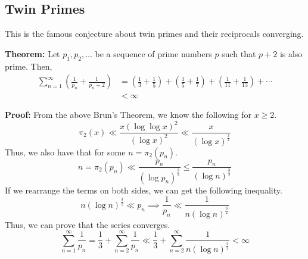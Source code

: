 \documentclass[8pt]{extarticle}
\begin{document}
\subsection{Twin Primes}
This is the famous conjecture about twin primes and their reciprocals converging.
\begin{boxedsection}
    \textbf{Theorem:} Let $p_1, p_2, \dots$ be a sequence of prime numbers $p$ such that $p+2$ is also prime. Then,
    \begin{align*}
        \sum_{n=1}^\infty \left(\frac{1}{p_n} + \frac{1}{p_n+2}\right) &= \left(\frac{1}{3} + \frac{1}{5}\right) + \left(\frac{1}{5} + \frac{1}{7}\right) + \left(\frac{1}{11} + \frac{1}{13}\right) + \cdots\\
        &< \infty
    \end{align*}
\end{boxedsection}
\begin{boxedsection}
    \textbf{Proof:} From the above Brun's Theorem, we know the following for $x \geq 2$.
    $$
    \pi_2(x) \ll \frac{x (\log \log x)^2}{(\log x)^2} \ll \frac{x}{(\log x)^{\frac{3}{2}}}
    $$
    Thus, we also have that for some $n = \pi_2(p_n)$.
    $$
    n = \pi_2(p_n) \ll \frac{p_n}{(\log p_n)^{\frac{3}{2}}} \leq \frac{p_n}{(\log n)^\frac{3}{2}}
    $$
    If we rearrange the terms on both sides, we can get the following inequality.
    $$
    n (\log n)^{\frac{3}{2}} \ll p_n \implies \frac{1}{p_n} \ll \frac{1}{n (\log n)^{\frac{3}{2}}}
    $$
    Thus, we can prove that the series converges.
    $$
    \sum_{n=1}^\infty \frac{1}{p_n} = \frac{1}{3} + \sum_{n=2}^\infty \frac{1}{p_n} \ll \frac{1}{3} + \sum_{n=2}^\infty \frac{1}{n (\log n)^{\frac{3}{2}}} < \infty
    $$
\end{boxedsection}
\end{document}
